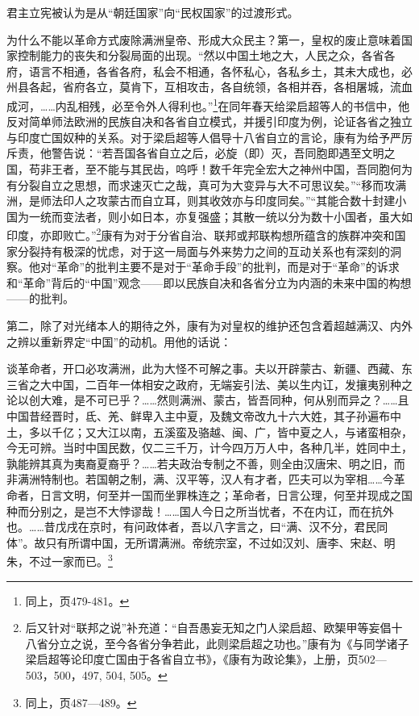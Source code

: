 \documentclass[a4paper, 12pt, openright]{ctexbook}
\renewenvironment{quote}
  {\list{}{\rightmargin2\ccwd \leftmargin2\ccwd \itemindent=2\ccwd \listparindent=2\ccwd}%
   \item\relax\small\kaishu\color{black}}
  {\endlist}
\begin{document}
君主立宪被认为是从“朝廷国家”向“民权国家”的过渡形式。

为什么不能以革命方式废除满洲皇帝、形成大众民主？第一，皇权的废止意味着国家控制能力的丧失和分裂局面的出现。“然以中国土地之大，人民之众，各省各府，语言不相通，各省各府，私会不相通，各怀私心，各私乡土，其未大成也，必州县各起，省府各立，莫肯下，互相攻击，各自统领，各相并吞，各相屠城，流血成河，……内乱相残，必至令外人得利也。”\footnote{同上，页479-481。}在同年春天给梁启超等人的书信中，他反对简单师法欧洲的民族自决和各省自立模式，并援引印度为例，论证各省之独立与印度亡国奴种的关系。对于梁启超等人倡导十八省自立的言论，康有为给予严厉斥责，他警告说：“若吾国各省自立之后，必旋（即）灭，吾同胞即遇至文明之国，苟非王者，至不能与其民齿，呜呼！数千年完全宏大之神州中国，吾同胞何为有分裂自立之思想，而求速灭亡之哉，真可为大变异与大不可思议矣。”“移而攻满洲，是师法印人之攻蒙古而自立耳，则其收效亦与印度同矣。”“其能合数十封建小国为一统而变法者，则小如日本，亦复强盛；其散一统以分为数十小国者，虽大如印度，亦即败亡。”\footnote{后又针对“联邦之说”补充道：“自吾愚妄无知之门人梁启超、欧榘甲等妄倡十八省分立之说，至今各省分争若此，此则梁启超之功也。”康有为《与同学诸子梁启超等论印度亡国由于各省自立书》，《康有为政论集》，上册，页502—503，500，497, 504, 505。}康有为对于分省自治、联邦或邦联构想所蕴含的族群冲突和国家分裂持有极深的忧虑，对于这一局面与外来势力之间的互动关系也有深刻的洞察。他对“革命”的批判主要不是对于“革命手段”的批判，而是对于“革命”的诉求和“革命”背后的“中国”观念——即以民族自决和各省分立为内涵的未来中国的构想——的批判。

第二，除了对光绪本人的期待之外，康有为对皇权的维护还包含着超越满汉、内外之辨以重新界定“中国”的动机。用他的话说：

\begin{quote}
谈革命者，开口必攻满洲，此为大怪不可解之事。夫以开辟蒙古、新疆、西藏、东三省之大中国，二百年一体相安之政府，无端妄引法、美以生内讧，发攘夷别种之论以创大难，是不可已乎？……然则满洲、蒙古，皆吾同种，何从别而异之？……且中国昔经晋时，氐、羌、鲜卑入主中夏，及魏文帝改九十六大姓，其子孙遍布中土，多以千亿；又大江以南，五溪蛮及骆越、闽、广，皆中夏之人，与诸蛮相杂，今无可辨。当时中国民数，仅二三千万，计今四万万人中，各种几半，姓同中土，孰能辨其真为夷裔夏裔乎？……若夫政治专制之不善，则全由汉唐宋、明之旧，而非满洲特制也。若国朝之制，满、汉平等，汉人有才者，匹夫可以为宰相……今革命者，日言文明，何至并一国而坐罪株连之；革命者，日言公理，何至并现成之国种而分别之，是岂不大悖谬哉！……国人今日之所当忧者，不在内讧，而在抗外也。……昔戊戌在京时，有问政体者，吾以八字言之，曰“满、汉不分，君民同体”。故只有所谓中国，无所谓满洲。帝统宗室，不过如汉刘、唐李、宋赵、明朱，不过一家而已。\footnote{同上，页487—489。}
\end{quote}
\end{document}
